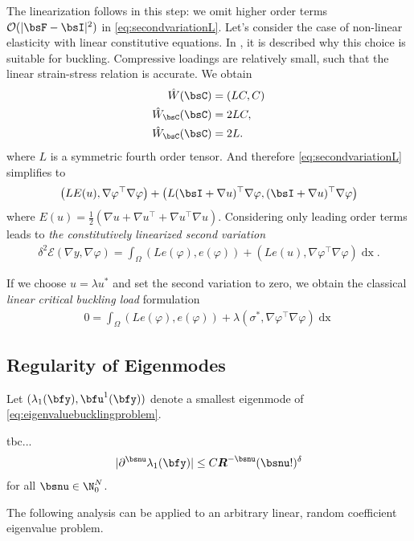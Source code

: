 The linearization follows in this step: we omit higher order terms $\mathcal{O}(\vert \bsF- \bsI \vert^2) $ in \eqref{eq:secondvariationL}. 
 Let's consider the case of non-linear elasticity with linear constitutive equations. In \cite{grabovsky2013rigorousasymptoticanalysisbuckling}, it is described why this choice is suitable for buckling. Compressive loadings are relatively small, such that the linear strain-stress relation is accurate.
 We obtain 
 \begin{align*}
     \hat W(\bsC) &= (LC,C ) \\
     \hat W_{\bsC} (\bsC) &= 2LC, \\
     \hat W_{\bsC} (\bsC) &= 2L.
 \end{align*}
 where $L$ is a symmetric fourth order tensor.
 And therefore \eqref{eq:secondvariationL} simplifies to 
 \begin{align}
     \left ( L E(u), \nabla \varphi^\top \nabla \varphi \right) +  
     \left( L(\bsI + \nabla u )^\top \nabla \varphi, (\bsI + \nabla u )^\top \nabla \varphi\right)
 \end{align}
 where $E(u) = \frac 1 2  ( \nabla u + \nabla u ^\top  + \nabla u ^\top \nabla u)$.
 Considering only leading order terms leads to \emph{ the constitutively linearized second variation}
 \begin{align}
      \delta^2 \mathcal{E}(\nabla y, \nabla \varphi) =  \int_{\Omega}  \left( L e(\varphi), e(\varphi) \right) + \left( Le(u), \nabla \varphi^\top \nabla \varphi \right) \mathop{dx}.
 \end{align}

 If we choose $ u = \lambda u^* $ and set the second variation to zero, we obtain the classical \emph{linear critical buckling load} formulation
 \begin{align}
     0 = \int_{\Omega} \left( L e(\varphi), e(\varphi) \right) + \lambda\left( \sigma^* , \nabla \varphi^\top \nabla \varphi \right)\mathop{dx}
 \end{align}
 





\subsection{Regularity of Eigenmodes}
Let $(\lambda_1(\bfy), \bfu^1(\bfy))$ denote a smallest eigenmode of \eqref{eq:eigenvaluebucklingproblem}.
\begin{theorem} tbc...
    \begin{align*}
        \vert \partial^{\bsnu} \lambda_1(\bfy) \vert  \leq  C \boldsymbol{R}^{-\bsnu} (\bsnu !)^\delta 
    \end{align*}
    for all $\bsnu \in \N^N_0$.
\end{theorem}
The following analysis can be applied to an arbitrary linear, random coefficient eigenvalue problem.

